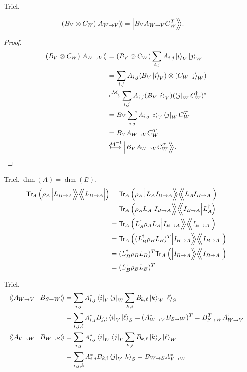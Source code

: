 \documentclass[10pt]{beamer}
\newcommand{\Tr}{\mathsf{Tr}}
\newcommand\kett[1]{|#1\rangle\!\rangle}
\newcommand\Kett[1]{\Bigl|#1\Big\rangle\!\!\Big\rangle}
\newcommand\Braa[1]{\Bigl\langle\!\!\Bigl\langle#1\Bigr|}
\newcommand\braakett[1]{\langle\!\langle#1\rangle\!\rangle}
\begin{document}
\begin{frame}{Trick}
\small
\begin{lemma}
\begin{align*}
(B_V\otimes C_W) \kett{A_{W\to V}} &= \Kett{B_VA_{W\to V}C_W^T}.
\end{align*}
\end{lemma}
\begin{proof}
\vspace{-.5em}
\begin{align*}
(B_V\otimes C_W) \kett{A_{W\to V}}
&= (B_V\otimes C_W)\sum_{i,j}A_{i,j}\ket{i}_V\ket{j}_W\\
&= \sum_{i,j}A_{i,j}(B_V \ket{i}_V)\otimes(C_W \ket{j}_W)\\
&\overset{\mathcal{M}}{\longmapsto}
\sum_{i,j}A_{i,j}(B_V \ket{i}_V)(\bra{j}_WC_W^\dagger)^*\\
&=B_V \sum_{i,j}A_{i,j}\ket{i}_V\bra{j}_WC_W^T\\
&=B_V A_{W\to V} C_W^T\\
&\overset{\mathcal{M}^{-1}}{\longmapsto} \Kett{B_VA_{W\to V}C_W^T}.
\end{align*}
\end{proof}
\end{frame}

\begin{frame}{Trick}
$\dim(A)=\dim(B)$.
\begin{align*}
\Tr_A\left(\rho_A \,\Kett{L_{B\to A}}\Braa{L_{B\to A}}\right)
&= \Tr_A\left(\rho_A \,\Kett{L_{A}I_{B\to A}}\Braa{L_{A}I_{B\to A}}\right)\\
&= \Tr_A\left(\rho_A L_A\Kett{I_{B\to A}}\Braa{I_{B\to A}}L_A^\dagger\right)\\
&= \Tr_A\left(L_A^\dagger \rho_A L_A\Kett{I_{B\to A}}\Braa{I_{B\to A}}\right)\\
&= \Tr_A\left((L_B^\dagger \rho_B L_B)^T\Kett{I_{B\to A}}\Braa{I_{B\to A}}\right)\\
&= (L_B^\dagger \rho_B L_B)^T\Tr_A\left(\Kett{I_{B\to A}}\Braa{I_{B\to A}}\right)\\
&= (L_B^\dagger \rho_B L_B)^T
\end{align*}
\end{frame}

\begin{frame}{Trick}
\begin{align*}
\braakett{A_{W\to V}\mid B_{S\to W}}&=\sum_{i,j}A_{i,j}^*\bra{i}_V\bra{j}_W \sum_{k,\ell} B_{k,\ell}\ket{k}_W \ket{\ell}_S\\
&=\sum_{i,j,\ell}A_{i,j}^* B_{j,\ell} \bra{i}_V\ket{\ell}_S=(A_{W\to V}^*B_{S\to W})^T=B_{S\to W}^TA_{W\to V}^\dagger\\
\braakett{A_{V\to W}\mid B_{W\to S}}&=\sum_{i,j}A_{i,j}^*\bra{i}_W\bra{j}_V \sum_{k,\ell} B_{k,\ell}\ket{k}_S \ket{\ell}_W\\
&=\sum_{i,j,k}A_{i,j}^* B_{k,i} \bra{j}_V\ket{k}_S=B_{W\to S}A_{V\to W}^*
\end{align*}
\end{frame}
\fi
\end{document}
